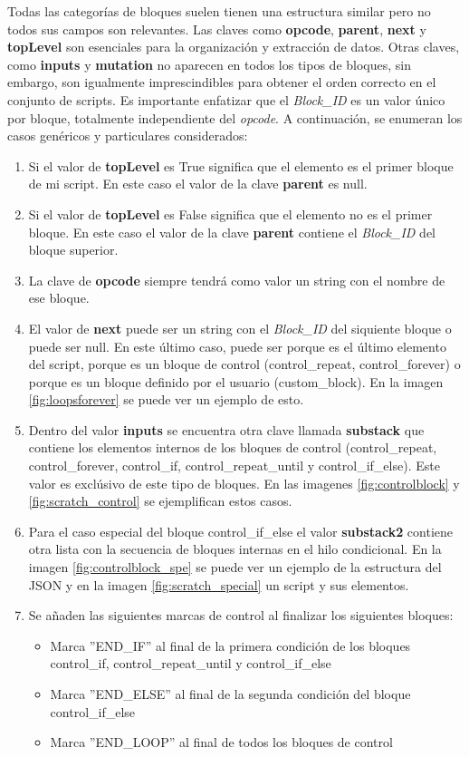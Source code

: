 \documentclass[a4paper, 12pt]{book}
\begin{document}
Todas las categorías de bloques suelen tienen una estructura similar pero no todos sus campos son relevantes. Las claves como \textbf{opcode}, \textbf{parent}, \textbf{next} y \textbf{topLevel} son esenciales para la organización y extracción de datos. Otras claves, como \textbf{inputs} y \textbf{mutation} no aparecen en todos los tipos de bloques, sin embargo, son igualmente imprescindibles para obtener el orden correcto en el conjunto de scripts. Es importante enfatizar que el \textit{Block\_ID} es un valor único por bloque, totalmente independiente del \textit{opcode}. A continuación, se enumeran los casos genéricos y particulares considerados:

\begin{enumerate}
\item Si el valor de \textbf{topLevel} es True significa que el elemento es el primer bloque de mi script. En este caso el valor de la clave \textbf{parent} es null. 
\item Si el valor de \textbf{topLevel} es False significa que el elemento no es el primer bloque. En este caso el valor de la clave \textbf{parent} contiene el \textit{Block\_ID} del bloque superior.
\item La clave de \textbf{opcode} siempre tendrá como valor un string con el nombre de ese bloque.
\item El valor de \textbf{next} puede ser un string con el \textit{Block\_ID} del siquiente bloque o puede ser null. En este último caso, puede ser porque es el último elemento del script, porque es un bloque de control (control\_repeat, control\_forever) o porque es un bloque definido por el usuario (custom\_block). En la imagen \ref{fig:loopsforever} se puede ver un ejemplo de esto.
\item Dentro del valor \textbf{inputs} se encuentra otra clave llamada \textbf{substack} que contiene los elementos internos de los bloques de control (control\_repeat, control\_forever, control\_if, control\_repeat\_until y control\_if\_else). Este valor es exclúsivo de este tipo de bloques. En las imagenes \ref{fig:controlblock} y \ref{fig:scratch_control} se ejemplifican estos casos.
\item Para el caso especial del bloque control\_if\_else el valor \textbf{substack2} contiene otra lista con la secuencia de bloques internas en el hilo condicional. En la imagen \ref{fig:controlblock_spe} se puede ver un ejemplo de la estructura del JSON y en la imagen \ref{fig:scratch_special} un script y sus elementos.
\item Se añaden las siguientes marcas de control al finalizar los siguientes bloques:
\begin{itemize}
\item Marca ''END\_IF'' al final de la primera condición de los bloques control\_if, control\_repeat\_until y control\_if\_else
\item Marca ''END\_ELSE'' al final de la segunda condición del bloque control\_if\_else
\item Marca ''END\_LOOP'' al final de todos los bloques de control
\end{itemize}
\end{enumerate}
\end{document}
